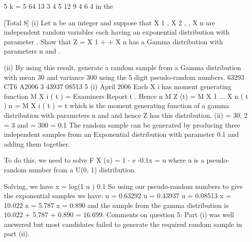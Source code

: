 \documentclass[a4paper,12pt]{article}
\begin{document}
5
k = 5
64%
13%
3%
4%
5%
12%
9%
4%
6%
4%
in the

[Total 8]
(i) Let n be an integer and suppose that X 1 , X 2 , , X n are independent random
variables each having an exponential distribution with parameter . Show that
Z = X 1 + + X n has a Gamma distribution with parameters n and .

(ii) By using this result, generate a random sample from a Gamma distribution
with mean 30 and variance 300 using the 5 digit pseudo-random numbers.
63293
CT6 A2006 3
43937
08513
5
(i)
April 2006
Each X i has moment generating function M X i ( t ) =
Examiners Report
t
. Hence
n
M Z (t) = M X 1
... X n ( t )
n
= M X i ( t ) =
t
which is the moment generating function of a gamma distribution with parameters n and and hence Z has this distribution.
(ii)
= 30,
2
= 3 and
= 300
= 0.1
The random sample can be generated by producing three independent samples from an Exponential distribution with parameter 0.1 and adding them together.

To do this, we need to solve
F X (x) = 1 - e -0.1x = u
where u is a pseudo-random number from a U(0, 1) distribution.

Solving, we have x =
log(1 u )
0.1
So using our pseudo-random numbers to give the exponential samples we have:
u = 0.63292
u = 0.43937
u = 0.08513
x = 10.022
x = 5.787
x = 0.890
and the sample from the gamma distribution is
10.022 + 5.787 + 0.890 = 16.699.
Comments on question 5: Part (i) was well answered but most candidates failed to generate
the required random sample in part (ii).

\end{document}

